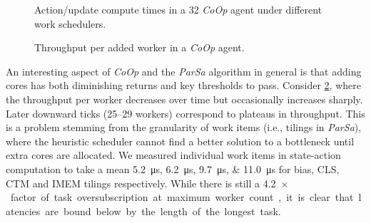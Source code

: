 \documentclass[
sigconf,natbib=false
]{acmart}
\newcommand{\Coopfw}{\emph{CoOp}}
\begin{document}
\begin{figure}
	\caption{Action/update compute times in a \SI{32}{\bit} \Coopfw{} agent under different work schedulers.\label{fig:work-alloc-32}}
\end{figure}

\begin{figure}
	\caption{Throughput per added worker in a \Coopfw{} agent.\label{fig:tput-per-core}}
\end{figure}

An interesting aspect of \Coopfw{} and the \emph{ParSa} algorithm in general is that adding cores has both diminishing returns and key thresholds to pass.
Consider \cref{fig:tput-per-core}, where the throughput per worker decreases over time but occasionally increases sharply.
Later downward ticks (\numrange{25}{29} workers) correspond to plateaus in throughput.
This is a problem stemming from the granularity of work items (i.e., tilings in \emph{ParSa}), where the heuristic scheduler cannot find a better solution to a bottleneck until extra cores are allocated.
We measured individual work items in state-action computation to take a mean \SIlist{5.2; 6.2; 9.7; 11.0}{\micro\second} for bias, CLS, CTM and IMEM tilings respectively.
While there is still a \SI{4.2}{$\times$} factor of task oversubscription at maximum worker count, it is clear that latencies are bound below by the length of the longest task.
\end{document}
